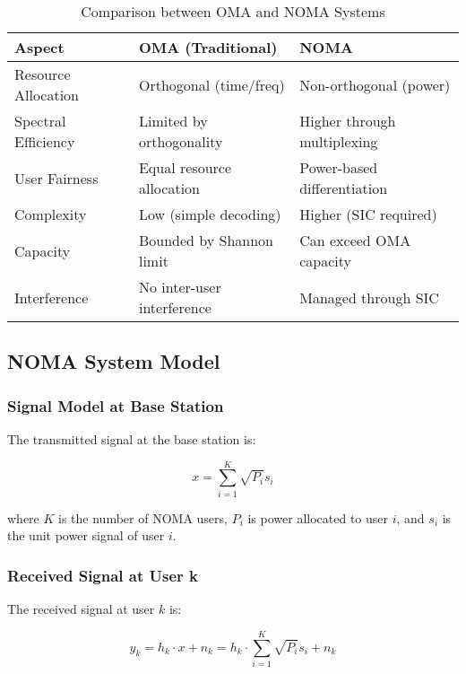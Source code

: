 \documentclass[11pt,a4paper]{article}
\begin{document}
\begin{table}[H]
\centering
\begin{tabular}{@{}p{3cm}p{5cm}p{5cm}@{}}
\toprule
\textbf{Aspect} & \textbf{OMA (Traditional)} & \textbf{NOMA} \\
\midrule
Resource Allocation & Orthogonal (time/freq) & Non-orthogonal (power) \\
Spectral Efficiency & Limited by orthogonality & Higher through multiplexing \\
User Fairness & Equal resource allocation & Power-based differentiation \\
Complexity & Low (simple decoding) & Higher (SIC required) \\
Capacity & Bounded by Shannon limit & Can exceed OMA capacity \\
Interference & No inter-user interference & Managed through SIC \\
\bottomrule
\end{tabular}
\caption{Comparison between OMA and NOMA Systems}
\label{tab:oma_noma_comparison}
\end{table}

\subsection{NOMA System Model}

\subsubsection{Signal Model at Base Station}

The transmitted signal at the base station is:

\begin{equation}
x = \sum_{i=1}^{K} \sqrt{P_i} s_i
\end{equation}

where $K$ is the number of NOMA users, $P_i$ is power allocated to user $i$, and $s_i$ is the unit power signal of user $i$.

\subsubsection{Received Signal at User k}

The received signal at user $k$ is:

\begin{equation}
y_k = h_k \cdot x + n_k = h_k \cdot \sum_{i=1}^{K} \sqrt{P_i} s_i + n_k
\end{equation}
\end{document}
